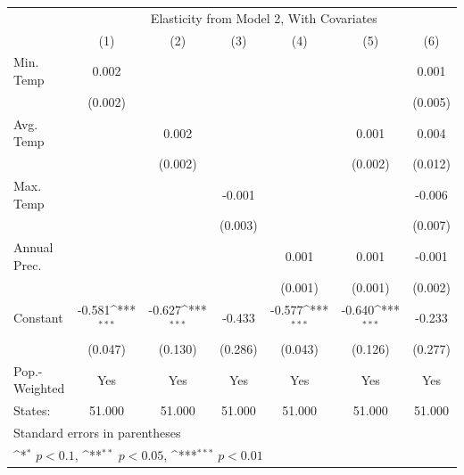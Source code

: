 {
\def\sym#1{\ifmmode^{#1}\else\(^{#1}\)\fi}
\begin{tabular}{l*{6}{c}}
\hline\hline
            &\multicolumn{6}{c}{Elasticity from Model 2, With Covariates}                                                                       \\
            &\multicolumn{1}{c}{(1)}         &\multicolumn{1}{c}{(2)}         &\multicolumn{1}{c}{(3)}         &\multicolumn{1}{c}{(4)}         &\multicolumn{1}{c}{(5)}         &\multicolumn{1}{c}{(6)}         \\
\hline
Min. Temp   &       0.002         &                     &                     &                     &                     &       0.001         \\
            &     (0.002)         &                     &                     &                     &                     &     (0.005)         \\
[1em]
Avg. Temp   &                     &       0.002         &                     &                     &       0.001         &       0.004         \\
            &                     &     (0.002)         &                     &                     &     (0.002)         &     (0.012)         \\
[1em]
Max. Temp   &                     &                     &      -0.001         &                     &                     &      -0.006         \\
            &                     &                     &     (0.003)         &                     &                     &     (0.007)         \\
[1em]
Annual Prec.&                     &                     &                     &       0.001         &       0.001         &      -0.001         \\
            &                     &                     &                     &     (0.001)         &     (0.001)         &     (0.002)         \\
[1em]
Constant    &      -0.581\sym{***}&      -0.627\sym{***}&      -0.433         &      -0.577\sym{***}&      -0.640\sym{***}&      -0.233         \\
            &     (0.047)         &     (0.130)         &     (0.286)         &     (0.043)         &     (0.126)         &     (0.277)         \\
\hline
Pop.-Weighted&         Yes         &         Yes         &         Yes         &         Yes         &         Yes         &         Yes         \\
States:     &      51.000         &      51.000         &      51.000         &      51.000         &      51.000         &      51.000         \\
\hline\hline
\multicolumn{7}{l}{\footnotesize Standard errors in parentheses}\\
\multicolumn{7}{l}{\footnotesize \sym{*} \(p<0.1\), \sym{**} \(p<0.05\), \sym{***} \(p<0.01\)}\\
\end{tabular}
}
